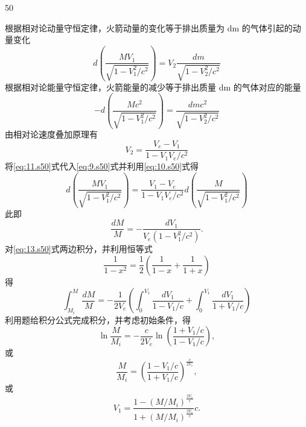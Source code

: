 \begin{solution}{50}
\begin{subsolution}
根据相对论动量守恒定律，火箭动量的变化等于排出质量为 dm 的气体引起的动量变化
\begin{equation}
d\left(\frac{MV_{1}}{\sqrt{1 - V_{1}^{2}/c^{2}}}\right) = V_{2}\frac{dm}{\sqrt{1 - V_{2}^{2}/c^{2}}}
\label{eq:9.s50}
\end{equation}
根据相对论能量守恒定律，火箭能量的减少等于排出质量 dm 的气体对应的能量
\begin{equation}
-d\left(\frac{Mc^{2}}{\sqrt{1 - V_{1}^{2}/c^{2}}}\right) = \frac{dmc^{2}}{\sqrt{1 - V_{2}^{2}/c^{2}}}
\label{eq:10.s50}
\end{equation}
由相对论速度叠加原理有
\begin{equation}
V_{2} = \frac{V_{e} - V_{1}}{1 - V_{1}V_{e}/c^{2}}
\label{eq:11.s50}
\end{equation}
将\eqref{eq:11.s50}式代入\eqref{eq:9.s50}式并利用\eqref{eq:10.s50}式得
\begin{equation}
d\left(\frac{MV_{1}}{\sqrt{1 - V_{1}^{2}/c^{2}}}\right) = \frac{V_{1} - V_{e}}{1 - V_{1}V_{e}/c^{2}} d\left(\frac{M}{\sqrt{1 - V_{1}^{2}/c^{2}}}\right)
\label{eq:12.s50}
\end{equation}
此即
\begin{equation}
\frac{dM}{M} = -\frac{dV_{1}}{V_{e}(1 - V_{1}^{2}/c^{2})}.
\label{eq:13.s50}
\end{equation}
对\eqref{eq:13.s50}式两边积分，并利用恒等式
\begin{equation}
\frac{1}{1 - x^{2}} = \frac{1}{2}\left(\frac{1}{1 - x} + \frac{1}{1 + x}\right)
\label{eq:14.s50}
\end{equation}
得
\begin{equation}
\int_{M_{i}}^{M} \frac{dM}{M} = -\frac{1}{2V_{e}}\left(\int_{0}^{V_{1}} \frac{dV_{1}}{1 - V_{1}/c} + \int_{0}^{V_{1}} \frac{dV_{1}}{1 + V_{1}/c}\right)
\label{eq:15.s50}
\end{equation}
利用题给积分公式完成积分，并考虑初始条件，得
\begin{equation}
\ln \frac{M}{M_{i}} = -\frac{c}{2V_{e}} \ln \left(\frac{1 + V_{1}/c}{1 - V_{1}/c}\right),
\label{eq:16.s50}
\end{equation}
或
\begin{equation}
\frac{M}{M_{i}} = \left(\frac{1 - V_{1}/c}{1 + V_{1}/c}\right)^{\frac{c}{2V_{e}}},
\label{eq:17.s50}
\end{equation}
或
\begin{equation}
V_{1} = \frac{1 - (M/M_{i})^{\frac{2V_{e}}{c}}}{1 + (M/M_{i})^{\frac{2V_{e}}{c}}}c.
\label{eq:18.s50}
\end{equation}
\end{subsolution}

\end{solution}
